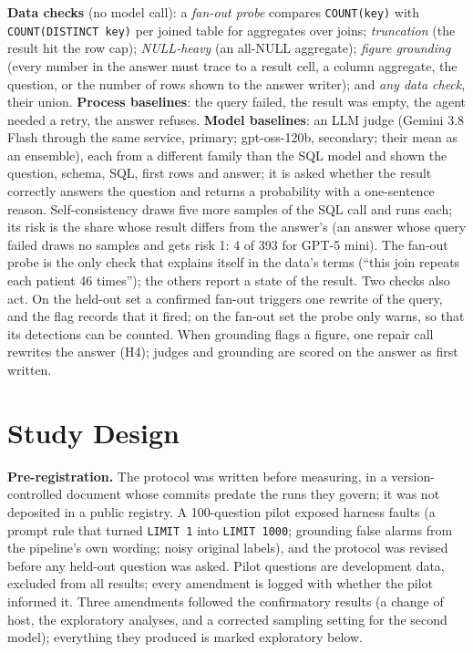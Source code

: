\documentclass[conference]{IEEEtran}
\begin{document}
\textbf{Data checks} (no model call): a \emph{fan-out probe} compares \texttt{COUNT(key)} with
\texttt{COUNT(DISTINCT key)} per joined table for aggregates over joins; \emph{truncation} (the result
hit the row cap); \emph{NULL-heavy} (an all-NULL aggregate); \emph{figure grounding} (every number in
the answer must trace to a result cell, a column aggregate, the question, or the number of rows shown
to the answer writer); and \emph{any data check}, their union. \textbf{Process baselines}: the query
failed, the result was empty, the agent needed a retry, the answer refuses. \textbf{Model baselines}:
an LLM judge (Gemini 3.8 Flash through the same service, primary; gpt-oss-120b, secondary; their mean as
an ensemble), each
from a different family than the SQL model and shown the question, schema, SQL, first rows and answer;
it is asked whether the result correctly answers the question and returns a probability with a
one-sentence reason. Self-consistency draws five more samples of the SQL call and runs each; its risk
is the share whose result differs from the answer's (an answer whose query failed draws no samples and
gets risk 1: 4 of 393 for GPT-5 mini). The fan-out probe is the only check that explains
itself in the data's terms (``this join repeats each patient 46 times''); the others report a state of
the result. Two checks also act. On the held-out set a confirmed fan-out triggers one rewrite of the
query, and the flag records that it fired; on the fan-out set the probe only warns, so that its
detections can be counted. When grounding flags a figure, one repair call rewrites the answer (H4);
judges and grounding are scored on the answer as first written.

\section{Study Design}

\textbf{Pre-registration.} The protocol was written before measuring, in a version-controlled
document whose commits predate the runs they govern; it was not deposited in a public registry. A 100-question pilot exposed
harness faults (a prompt rule that turned \texttt{LIMIT 1} into \texttt{LIMIT 1000}; grounding false
alarms from the pipeline's own wording; noisy original labels), and the protocol was revised before
any held-out question was asked. Pilot questions are development data, excluded from all results;
every amendment is logged with whether the pilot informed it. Three amendments followed the
confirmatory results (a change of host, the exploratory analyses, and a corrected sampling setting
for the second model); everything they produced is marked exploratory below.
\end{document}

